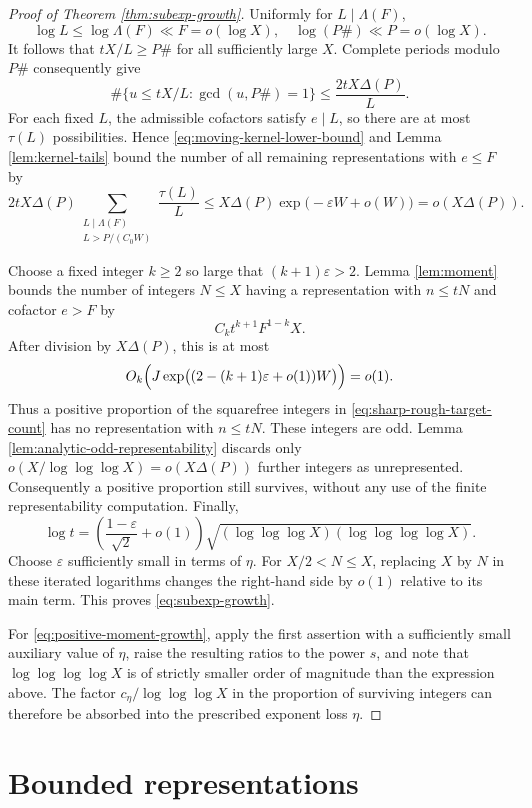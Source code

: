\documentclass[11pt,letterpaper,reqno]{amsart}
\numberwithin{equation}{section}
\theoremstyle{remark}
\renewcommand{\leq}{\leqslant}
\renewcommand{\geq}{\geqslant}
\begin{document}
\begin{proof}[Proof of Theorem \ref{thm:subexp-growth}]
Uniformly for $L\mid \Lambda(F)$,
\[
 \log L\leq\log \Lambda(F)\ll F=o(\log X),
 \quad \log(P\#)\ll P=o(\log X).
\]
It follows that $tX/L\geq P\#$ for all sufficiently large $X$. Complete
periods modulo $P\#$ consequently give
\[
 \#\{u\leq tX/L:\gcd(u,P\#)=1\}
 \leq\frac{2tX\Delta(P)}{L}.
\]
For each fixed $L$, the admissible cofactors satisfy $e\mid L$, so there are
at most $\tau(L)$ possibilities. Hence \eqref{eq:moving-kernel-lower-bound}
and Lemma \ref{lem:kernel-tails} bound the number of all remaining
representations with $e\leq F$ by
\[
 2tX\Delta(P)
 \sum_{\substack{L\mid \Lambda(F)\\L>P/(C_0W)}}\frac{\tau(L)}L
 \leq X\Delta(P)\exp\bigl(-\varepsilon W+o(W)\bigr)
 =o(X\Delta(P)).
\]

Choose a fixed integer $k\geq2$ so large that $(k+1)\varepsilon>2$.
Lemma \ref{lem:moment} bounds the number of integers $N\leq X$ having a representation with $n\leq tN$ and
cofactor $e>F$ by
\[
 C_kt^{k+1}F^{1-k}X.
\]
After division by $X\Delta(P)$, this is at most
\[
 O_k\Bigl(J\exp\bigl((2-(k+1)\varepsilon+o(1))W\bigr)\Bigr)=o(1).
\]
Thus a positive proportion of the squarefree integers in
\eqref{eq:sharp-rough-target-count} has no representation with $n\leq tN$.
These integers are odd. Lemma \ref{lem:analytic-odd-representability}
discards only $o(X/\log\log\log X)=o(X\Delta(P))$ further integers as unrepresented.
Consequently a positive proportion still survives, without any use of the
finite representability computation. Finally,
\[
 \log t
 =\left(\frac{1-\varepsilon}{\sqrt2}+o(1)\right)
 \sqrt{(\log\log\log X)(\log\log\log\log X)}.
\]
Choose $\varepsilon$ sufficiently small in terms of $\eta$. For
$X/2<N\leq X$, replacing $X$ by $N$ in these iterated logarithms changes
the right-hand side by $o(1)$ relative to its main term. This proves
\eqref{eq:subexp-growth}.

For \eqref{eq:positive-moment-growth}, apply the first assertion with a
sufficiently small auxiliary value of $\eta$, raise the resulting ratios to
the power $s$, and note that $\log\log\log\log X$ is of strictly smaller order of magnitude than the expression above.
The factor $c_\eta/\log\log\log X$ in the proportion of surviving integers can
therefore be absorbed into the prescribed exponent loss $\eta$.
\end{proof}


\section{Bounded representations}
\label{sec:tightness}
\end{document}
